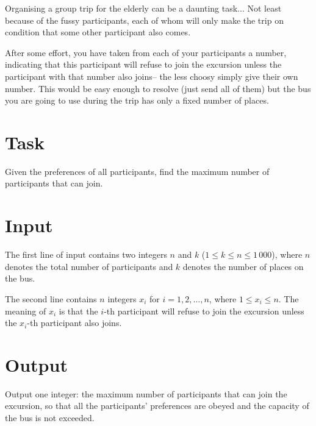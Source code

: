 

Organising a group trip for the elderly can be a daunting task... Not least because of the fussy participants, each of whom will only make the trip on condition that some other participant also comes.

After some effort, you have taken from each of your participants a number, indicating that this participant will refuse to join the excursion unless the participant with that number also joins-- the less choosy simply give their own number. This would be easy enough to resolve (just send all of them) but the bus you are going to use during the trip has only a fixed number of places.

\section*{Task}

Given the preferences of all participants, find the maximum number of participants that can join.

\section*{Input}

The first line of input contains two integers $n$ and $k$ ($1 \leq k \leq n \leq 1\, 000$), where $n$ denotes the total number of participants and $k$ denotes the number of places on the bus.

The second line contains $n$ integers $x_{i}$ for $i=1,2,\ldots,n$, where $1 \leq x_i \leq n$. The meaning of $x_i$ is that the $i$-th participant will refuse to join the excursion unless the $x_i$-th participant also joins.

\section*{Output}

Output one integer: the maximum number of participants that can join the excursion, so that all the participants' preferences are obeyed and the capacity of the bus is not exceeded.
